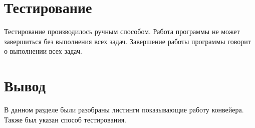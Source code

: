 \section{Тестирование}


Тестирование производилось ручным способом. Работа программы не может завершиться без выполнения 
всех задач. Завершение работы программы говорит о выполнении всех задач.


\section{Вывод}
В данном разделе были разобраны листинги  показывающие работу конвейера. Также был указан способ тестирования.

